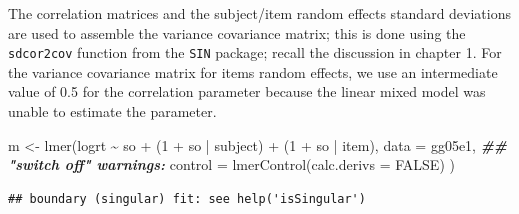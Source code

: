 \documentclass[
  12pt,
]{krantz}
\newenvironment{Shaded}{\begin{snugshade}}{\end{snugshade}}
\newcommand{\AttributeTok}[1]{\textcolor[rgb]{0.77,0.63,0.00}{#1}}
\newcommand{\ConstantTok}[1]{\textcolor[rgb]{0.00,0.00,0.00}{#1}}
\newcommand{\DecValTok}[1]{\textcolor[rgb]{0.00,0.00,0.81}{#1}}
\newcommand{\DocumentationTok}[1]{\textcolor[rgb]{0.56,0.35,0.01}{\textbf{\textit{#1}}}}
\newcommand{\FunctionTok}[1]{\textcolor[rgb]{0.00,0.00,0.00}{#1}}
\newcommand{\NormalTok}[1]{#1}
\newcommand{\OtherTok}[1]{\textcolor[rgb]{0.56,0.35,0.01}{#1}}
\newcommand{\SpecialCharTok}[1]{\textcolor[rgb]{0.00,0.00,0.00}{#1}}
\theoremstyle{definition}
\theoremstyle{definition}
\theoremstyle{definition}
\theoremstyle{definition}
\theoremstyle{remark}
\begin{document}
The correlation matrices and the subject/item random effects standard deviations are used to assemble the variance covariance matrix; this is done using the \texttt{sdcor2cov} function from the \texttt{SIN} package; recall the discussion in chapter 1. For the variance covariance matrix for items random effects, we use an intermediate value of 0.5 for the correlation parameter because the linear mixed model was unable to estimate the parameter.

\begin{Shaded}
\begin{Highlighting}[]
\NormalTok{m }\OtherTok{\textless{}{-}} \FunctionTok{lmer}\NormalTok{(logrt }\SpecialCharTok{\textasciitilde{}}\NormalTok{ so }\SpecialCharTok{+}
\NormalTok{  (}\DecValTok{1} \SpecialCharTok{+}\NormalTok{ so }\SpecialCharTok{|}\NormalTok{ subject) }\SpecialCharTok{+}
\NormalTok{  (}\DecValTok{1} \SpecialCharTok{+}\NormalTok{ so }\SpecialCharTok{|}\NormalTok{ item),}
\AttributeTok{data =}\NormalTok{ gg05e1,}
\DocumentationTok{\#\# "switch off" warnings:}
\AttributeTok{control =} \FunctionTok{lmerControl}\NormalTok{(}\AttributeTok{calc.derivs =} \ConstantTok{FALSE}\NormalTok{)}
\NormalTok{)}
\end{Highlighting}
\end{Shaded}

\begin{verbatim}
## boundary (singular) fit: see help('isSingular')
\end{verbatim}
\end{document}
